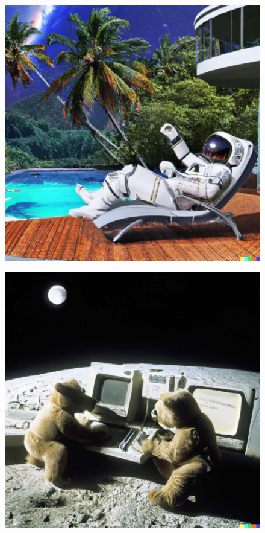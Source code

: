 \documentclass[a4paper]{article}
\begin{document}
\begin{figure}[h!]
\begin{center}
\includegraphics[scale=0.10]{astronaut.jpg}
\end{center}
\label{fig:astronaut}
\end{figure}

\begin{figure}[h!]
\begin{center}
\includegraphics[scale=0.10]{medvedi.jpg}
\end{center}
\label{fig:medvedi}
\end{figure}
\end{document}
